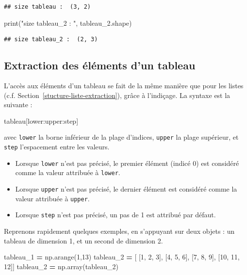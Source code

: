 \documentclass[12pt,]{book}
\newenvironment{Shaded}{\begin{snugshade}}{\end{snugshade}}
\newcommand{\DecValTok}[1]{\textcolor[rgb]{0.00,0.00,0.81}{#1}}
\newcommand{\StringTok}[1]{\textcolor[rgb]{0.31,0.60,0.02}{#1}}
\newcommand{\OperatorTok}[1]{\textcolor[rgb]{0.81,0.36,0.00}{\textbf{#1}}}
\newcommand{\BuiltInTok}[1]{#1}
\newcommand{\NormalTok}[1]{#1}
\providecommand{\tightlist}{%
  \setlength{\itemsep}{0pt}\setlength{\parskip}{0pt}}
\numberwithin{equation}{section}
\numberwithin{countremarque}{section}
\begin{document}
\begin{lstlisting}
## size tableau :  (3, 2)
\end{lstlisting}

\begin{Shaded}
\begin{Highlighting}[]
\BuiltInTok{print}\NormalTok{(}\StringTok{"size tableau_2 : "}\NormalTok{, tableau_2.shape)}
\end{Highlighting}
\end{Shaded}

\begin{lstlisting}
## size tableau_2 :  (2, 3)
\end{lstlisting}

\subsection{Extraction des éléments d'un
tableau}\label{extraction-des-elements-dun-tableau}

L'accès aux éléments d'un tableau se fait de la même manière que pour
les listes (c.f. Section~\ref{stucture-liste-extraction}), grâce à
l'indiçage. La syntaxe est la suivante :

\begin{Shaded}
\begin{Highlighting}[]
\NormalTok{tableau[lower:upper:step]}
\end{Highlighting}
\end{Shaded}

avec \texttt{lower} la borne inférieur de la plage d'indices,
\texttt{upper} la plage supérieur, et \texttt{step} l'espacement entre
les valeurs.

\begin{itemize}
\tightlist
\item
  Lorsque \texttt{lower} n'est pas précisé, le premier élément (indicé
  0) est considéré comme la valeur attribuée à \texttt{lower}.
\item
  Lorsque \texttt{upper} n'est pas précisé, le dernier élément est
  considéré comme la valeur attribuée à \texttt{upper}.
\item
  Lorsque \texttt{step} n'est pas précisé, un pas de 1 est attribué par
  défaut.
\end{itemize}

Reprenons rapidement quelques exemples, en s'appuyant sur deux objets :
un tableau de dimension 1, et un second de dimension 2.

\begin{Shaded}
\begin{Highlighting}[]
\NormalTok{tableau_1 }\OperatorTok{=}\NormalTok{ np.arange(}\DecValTok{1}\NormalTok{,}\DecValTok{13}\NormalTok{)}
\NormalTok{tableau_2 }\OperatorTok{=}\NormalTok{ [ [}\DecValTok{1}\NormalTok{, }\DecValTok{2}\NormalTok{, }\DecValTok{3}\NormalTok{], [}\DecValTok{4}\NormalTok{, }\DecValTok{5}\NormalTok{, }\DecValTok{6}\NormalTok{], [}\DecValTok{7}\NormalTok{, }\DecValTok{8}\NormalTok{, }\DecValTok{9}\NormalTok{], [}\DecValTok{10}\NormalTok{, }\DecValTok{11}\NormalTok{, }\DecValTok{12}\NormalTok{]]}
\NormalTok{tableau_2 }\OperatorTok{=}\NormalTok{ np.array(tableau_2)}
\end{Highlighting}
\end{Shaded}
\end{document}
